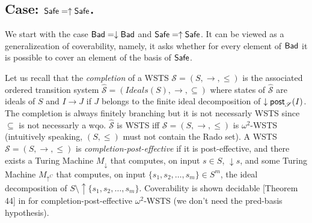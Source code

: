 




\subsection{Case: $\textsf{Safe}=\uparrow \textsf{Safe}$.}

%

We start with the case $\textsf{Bad}=\downarrow \textsf{Bad}$ and $\textsf{Safe}=\uparrow \textsf{Safe}$. 
It can be viewed as a generalizeation
 of coverability, namely,
it asks whether for every element of $\textsf{Bad}$ it is possible to cover an element of the basis of $\Safe$.




\iffalse
As a
example: in a VASS, we may choose $\Safe$ to be the set of states that are not deadlocks, i.e. from which it is always possible to fire a transition. This set of states is upward-closed and $\Safe=S \setminus \Bad=\uparrow \Safe$.\alain{mal rédigé}
\fi



%


%
Let us recall that the \emph{completion}  \cite{BFM-ic17} of a WSTS $\mathscr{S}=(S,\rightarrow, \leq)$ is the associated ordered transition system $\hat{\mathscr{S}}=(Ideals(S),\rightarrow, \subseteq)$ where states of $\hat{\mathscr{S}}$ are ideals of $S$ and $I \rightarrow J$ if $J$ belongs to the finite ideal decomposition of $\downarrow \textsf{post}_{\mathscr{S}}(I)$. The completion is always finitely branching but it is not necessarly WSTS since $\subseteq$ is not necessarly a wqo. $\hat{\mathscr{S}}$ is WSTS iff $\mathscr{S}=(S,\rightarrow, \leq)$ is $\omega^2$-WSTS (intuitively speaking, $(S,\leq)$ must not contain the Rado set). 
A WSTS $\mathscr{S}=(S,\rightarrow,\leq)$ is {\em completion-post-effective} if
it is post-effective, and there exists a Turing Machine $M_\downarrow$ that computes, on input $s \in S$, %
 $\downarrow s$, and some Turing Machine $M_{\uparrow^C}$ that computes, on input
 $\{s_1, s_2, \ldots, s_m\} \in S^m$, 
 the ideal decomposition of $S \setminus \uparrow \{ s_1, s_2, \ldots, s_m\}$.
Coverability is shown decidable  [Theorem 44] in \cite{BFM-ic17} for completion-post-effective $\omega^2$-WSTS (we don't need the pred-basis hypothesis).

